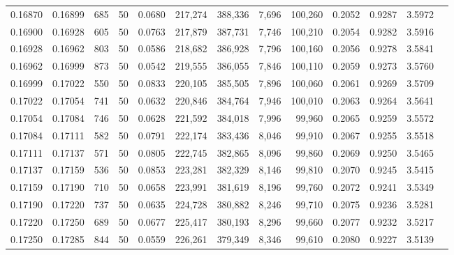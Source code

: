 \begin{tabular}{rrrrrrrrrrrrr}
0.16870 & 0.16899 &   685 &  50 &                                     0.0680 & 217,274 & 388,336 &   7,696 & 100,260 & 0.2052 & 0.9287 & 3.5972 \\
0.16900 & 0.16928 &   605 &  50 &                                     0.0763 & 217,879 & 387,731 &   7,746 & 100,210 & 0.2054 & 0.9282 & 3.5916 \\
0.16928 & 0.16962 &   803 &  50 &                                     0.0586 & 218,682 & 386,928 &   7,796 & 100,160 & 0.2056 & 0.9278 & 3.5841 \\
0.16962 & 0.16999 &   873 &  50 &                                     0.0542 & 219,555 & 386,055 &   7,846 & 100,110 & 0.2059 & 0.9273 & 3.5760 \\
0.16999 & 0.17022 &   550 &  50 &                                     0.0833 & 220,105 & 385,505 &   7,896 & 100,060 & 0.2061 & 0.9269 & 3.5709 \\
0.17022 & 0.17054 &   741 &  50 &                                     0.0632 & 220,846 & 384,764 &   7,946 & 100,010 & 0.2063 & 0.9264 & 3.5641 \\
0.17054 & 0.17084 &   746 &  50 &                                     0.0628 & 221,592 & 384,018 &   7,996 &  99,960 & 0.2065 & 0.9259 & 3.5572 \\
0.17084 & 0.17111 &   582 &  50 &                                     0.0791 & 222,174 & 383,436 &   8,046 &  99,910 & 0.2067 & 0.9255 & 3.5518 \\
0.17111 & 0.17137 &   571 &  50 &                                     0.0805 & 222,745 & 382,865 &   8,096 &  99,860 & 0.2069 & 0.9250 & 3.5465 \\
0.17137 & 0.17159 &   536 &  50 &                                     0.0853 & 223,281 & 382,329 &   8,146 &  99,810 & 0.2070 & 0.9245 & 3.5415 \\
0.17159 & 0.17190 &   710 &  50 &                                     0.0658 & 223,991 & 381,619 &   8,196 &  99,760 & 0.2072 & 0.9241 & 3.5349 \\
0.17190 & 0.17220 &   737 &  50 &                                     0.0635 & 224,728 & 380,882 &   8,246 &  99,710 & 0.2075 & 0.9236 & 3.5281 \\
0.17220 & 0.17250 &   689 &  50 &                                     0.0677 & 225,417 & 380,193 &   8,296 &  99,660 & 0.2077 & 0.9232 & 3.5217 \\
0.17250 & 0.17285 &   844 &  50 &                                     0.0559 & 226,261 & 379,349 &   8,346 &  99,610 & 0.2080 & 0.9227 & 3.5139 \\

\end{tabular}
